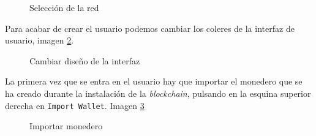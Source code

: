 \begin{figure}[h]
	\centering
	\caption{Selección de la red}
	\label{fig:wallet-6}
\end{figure}

Para acabar de crear el usuario podemos cambiar los coleres de la interfaz de usuario, imagen \ref{fig:wallet-7}.
\begin{figure}[h]
	\centering
	\caption{Cambiar diseño de la interfaz}
	\label{fig:wallet-7}
\end{figure}


La primera vez que se entra en el usuario hay que importar el monedero que se ha creado durante la instalación de la \textit{blockchain}, pulsando en la esquina superior derecha en \texttt{Import Wallet}. Imagen \ref{fig:wallet-8}
\begin{figure}[h]
	\centering
	\caption{Importar monedero}
	\label{fig:wallet-8}
\end{figure}

